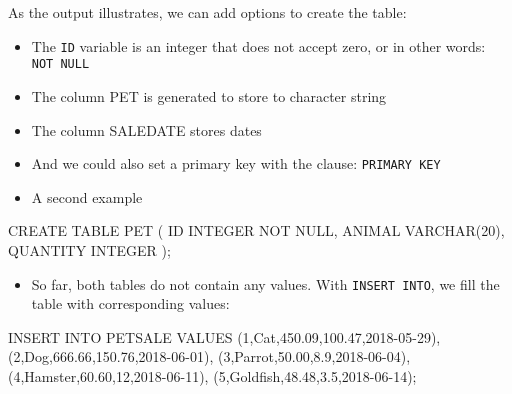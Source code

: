 \documentclass[
  letterpaper,
  DIV=11,
  numbers=noendperiod]{scrreprt}
\newenvironment{Shaded}{\begin{snugshade}}{\end{snugshade}}
\newcommand{\DataTypeTok}[1]{\textcolor[rgb]{0.68,0.00,0.00}{#1}}
\newcommand{\DecValTok}[1]{\textcolor[rgb]{0.68,0.00,0.00}{#1}}
\newcommand{\FloatTok}[1]{\textcolor[rgb]{0.68,0.00,0.00}{#1}}
\newcommand{\KeywordTok}[1]{\textcolor[rgb]{0.00,0.23,0.31}{#1}}
\newcommand{\NormalTok}[1]{\textcolor[rgb]{0.00,0.23,0.31}{#1}}
\newcommand{\StringTok}[1]{\textcolor[rgb]{0.13,0.47,0.30}{#1}}
\providecommand{\tightlist}{%
  \setlength{\itemsep}{0pt}\setlength{\parskip}{0pt}}\usepackage{longtable,booktabs,array}
\begin{document}
As the output illustrates, we can add options to create the table:

\begin{itemize}
\tightlist
\item
  The \texttt{ID} variable is an integer that does not accept zero, or
  in other words: \texttt{NOT\ NULL}
\item
  The column PET is generated to store to character string
\item
  The column SALEDATE stores dates
\item
  And we could also set a primary key with the clause:
  \texttt{PRIMARY\ KEY}
\item
  A second example
\end{itemize}

\begin{Shaded}
\begin{Highlighting}[]
\KeywordTok{CREATE} \KeywordTok{TABLE}\NormalTok{ PET (}
    \KeywordTok{ID} \DataTypeTok{INTEGER} \KeywordTok{NOT} \KeywordTok{NULL}\NormalTok{,}
\NormalTok{    ANIMAL }\DataTypeTok{VARCHAR}\NormalTok{(}\DecValTok{20}\NormalTok{),}
\NormalTok{    QUANTITY }\DataTypeTok{INTEGER}
\NormalTok{    );}
\end{Highlighting}
\end{Shaded}

\begin{itemize}
\tightlist
\item
  So far, both tables do not contain any values. With
  \texttt{INSERT\ INTO}, we fill the table with corresponding values:
\end{itemize}

\begin{Shaded}
\begin{Highlighting}[]
\KeywordTok{INSERT} \KeywordTok{INTO}\NormalTok{ PETSALE }\KeywordTok{VALUES}
\NormalTok{    (}\DecValTok{1}\NormalTok{,}\StringTok{\textquotesingle{}Cat\textquotesingle{}}\NormalTok{,}\FloatTok{450.09}\NormalTok{,}\FloatTok{100.47}\NormalTok{,}\StringTok{\textquotesingle{}2018{-}05{-}29\textquotesingle{}}\NormalTok{),}
\NormalTok{    (}\DecValTok{2}\NormalTok{,}\StringTok{\textquotesingle{}Dog\textquotesingle{}}\NormalTok{,}\FloatTok{666.66}\NormalTok{,}\FloatTok{150.76}\NormalTok{,}\StringTok{\textquotesingle{}2018{-}06{-}01\textquotesingle{}}\NormalTok{),}
\NormalTok{    (}\DecValTok{3}\NormalTok{,}\StringTok{\textquotesingle{}Parrot\textquotesingle{}}\NormalTok{,}\FloatTok{50.00}\NormalTok{,}\FloatTok{8.9}\NormalTok{,}\StringTok{\textquotesingle{}2018{-}06{-}04\textquotesingle{}}\NormalTok{),}
\NormalTok{    (}\DecValTok{4}\NormalTok{,}\StringTok{\textquotesingle{}Hamster\textquotesingle{}}\NormalTok{,}\FloatTok{60.60}\NormalTok{,}\DecValTok{12}\NormalTok{,}\StringTok{\textquotesingle{}2018{-}06{-}11\textquotesingle{}}\NormalTok{),}
\NormalTok{    (}\DecValTok{5}\NormalTok{,}\StringTok{\textquotesingle{}Goldfish\textquotesingle{}}\NormalTok{,}\FloatTok{48.48}\NormalTok{,}\FloatTok{3.5}\NormalTok{,}\StringTok{\textquotesingle{}2018{-}06{-}14\textquotesingle{}}\NormalTok{);}
\end{Highlighting}
\end{Shaded}
\end{document}
